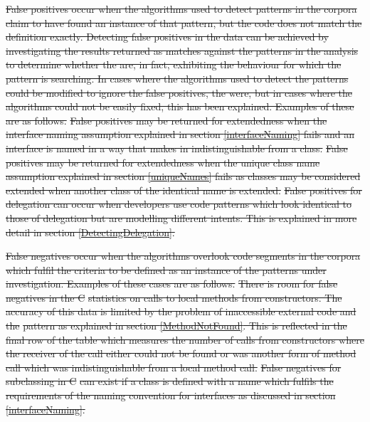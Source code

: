 \documentclass[11pt
              , a4paper
              , twoside
              , openright
              ]{report}
\newcommand{\cs}[1]{\lstinline[language=cs]{#1}}
\providecommand{\DIFdel}[1]{{\protect\color{red}\sout{#1}}}                      %
\begin{document}
\DIFdel{False positives occur when the algorithms used to detect patterns in the corpora claim to have found an instance of that pattern, but the code does not match the definition exactly. Detecting false positives in the data can be achieved by investigating the results returned as matches against the patterns in the analysis to determine whether the are, in fact, exhibiting the behaviour for which the pattern is searching. In cases where the algorithms used to detect the patterns could be modified to ignore the false positives, the were, but in cases where the algorithms could not be easily fixed, this has been explained. Examples of these are as follows.
}%
\DIFdel{False positives may be returned for extendedness when the interface naming assumption explained in section \ref{interfaceNaming} fails and an interface is named in a way that makes in indistinguishable from a class.
	}%
\DIFdel{False positives may be returned for extendedness when the unique class name assumption explained in section \ref{uniqueNames} fails as classes may be considered extended when another class of the identical name is extended.
	}%
\DIFdel{False positives for delegation can occur when developers use code patterns which look identical to those of delegation but are modelling different intents. This is explained in more detail in section \ref{DetectingDelegation}.
	}%

\DIFdel{False negatives occur when the algorithms overlook code segments in the corpora which fulfil the criteria to be defined as an instance of the patterns under investigation. Examples of these cases are as follows.
}%
\DIFdel{There is room for false negatives in the C}%
\DIFdel{statistics on calls to local methods from constructors. The accuracy of this data is limited by the problem of inaccessible external code and the }%
\DIFdel{pattern as explained in section \ref{MethodNotFound}. This is reflected in the final row of the table which measures the number of calls from constructors where the receiver of the call either could not be found or was another form of method call which was indistinguishable from a local method call.
	}%
\DIFdel{False negatives for subclassing in C}%
\DIFdel{can exist if a class is defined with a name which fulfils the requirements of the naming convention for interfaces as discussed in section \ref{interfaceNaming}.
}%
\end{document}
